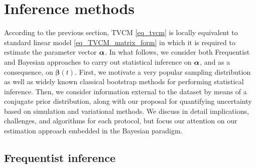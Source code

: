 \documentclass[letterpaper,10pt,openany]{article}
\def\betav{\boldsymbol{\beta}}
\begin{document}
\section{Inference methods}\label{sec_computation}


According to the previous section, \textsf{TVCM} \eqref{eq_tvcm} is locally equivalent to standard linear model \eqref{eq_TVCM_matrix_form} in which it is required to estimate the parameter vector $\boldsymbol{\alpha}$.  {\color{black} In what follows, we consider both Frequentist and Bayesian approaches to carry out statistical inference on $\boldsymbol{\alpha}$, and as a consequence, on $\betav(t)$. First, we motivate a very popular sampling distribution as well as widely known classical bootstrap methods for performing statistical inference. Then, we consider information external to the dataset by means of a conjugate prior distribution, along with our proposal for quantifying uncertainty based on simulation and variational methods. We discuss in detail implications, challenges, and algorithms for each protocol, but focus our attention on our estimation approach embedded in the Bayesian paradigm.}

\newpage


\subsection{Frequentist inference}
\end{document}
